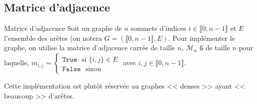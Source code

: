 \subsection{Matrice d'adjacence}
\begin{defi}{Matrice d'adjacence}
Soit un graphe de $n$ sommets d'indices $i \in \llbracket 0, n-1\rrbracket$ et $E$ l'ensemble des arêtes 
(on notera $G=\left( \llbracket 0, n-1\rrbracket,E\right)$. Pour implémenter le graphe, on utilise la matrice d'adjacence carrée de taille $n$, $\mathcal{M}_n$ \texttt{G} de taille $n$ pour laquelle,
$m_{i,j}=\left\{
\begin{array}{l}
\texttt{True } \text{ si } \{i,j\}\in E\\
\texttt{False } \text{ sinon } 
\end{array}
\right.$ avec $i,j\in \llbracket 0, n-1\rrbracket$. 


\end{defi}
\begin{rem}
Cette implémentation est plutôt réservée au graphes << denses >> ayant << beaucoup >> d'arêtes.
\end{rem}


